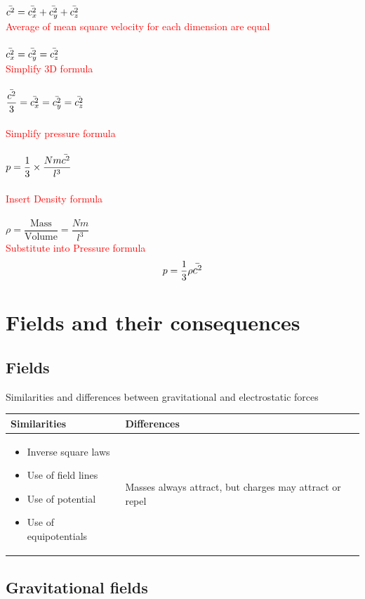 \documentclass[12pt]{article}
\begin{document}
\\
$\mathlarger{\bar{c^2}=\bar{c_x^2}+\bar{c_y^2}+\bar{c_z^2}}$\\
\textcolor{red}{Average of mean square velocity for each dimension are equal}\\
\\
$\mathlarger{\bar{c_x^2}=\bar{c_y^2}=\bar{c_z^2}}$\\
\textcolor{red}{Simplify 3D formula}\\
\\
$\mathlarger{\dfrac{\bar{c^2}}{3}=\bar{c_x^2}=\bar{c_y^2}=\bar{c_z^2}}$\\
\\
\textcolor{red}{Simplify pressure formula}\\
\\
$p=\dfrac{1}{3}\times\dfrac{Nm\mathlarger{\bar{c^2}}}{l^3}$\\
\\
\textcolor{red}{Insert Density formula}\\
\\
$\rho=\dfrac{\text{Mass}}{\text{Volume}}=\dfrac{Nm}{l^3}$
\\
\textcolor{red}{Substitute into Pressure formula}\\
$$p=\frac{1}{3}\rho\mathlarger{\bar{c^2}}$$
\section{Fields and their consequences}
\subsection{Fields}
Similarities and differences between gravitational and electrostatic forces\\
\begin{tabularx}{\textwidth}{|X|X|}
\hline
Similarities&Differences\\
\hline
\begin{itemize}
\item Inverse square laws
\item Use of field lines
\item Use of potential
\item Use of equipotentials
\end{itemize}& Masses always attract, but charges may attract or repel\\
\hline
\end{tabularx}
\newpage
\subsection{Gravitational fields}
\end{document}
